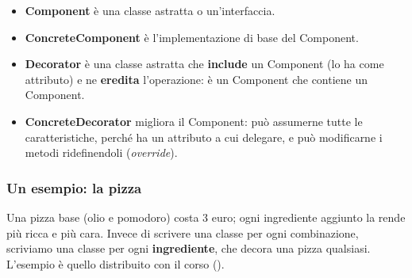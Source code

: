 
\noindent\begin{minipage}[c]{0.45\textwidth}
\centering
{}
\end{minipage}\hfill
\begin{minipage}[c]{0.52\textwidth}
\begin{itemize}
  \item \textbf{Component} è una classe astratta o un'interfaccia.
  \item \textbf{ConcreteComponent} è l'implementazione di base del Component.
  \item \textbf{Decorator} è una classe astratta che \textbf{include} un Component (lo ha come attributo) e ne
        \textbf{eredita} l'operazione: è un Component che contiene un Component.
  \item \textbf{ConcreteDecorator} migliora il Component: può assumerne tutte le caratteristiche, perché ha un attributo
         a cui delegare, e può modificarne i metodi ridefinendoli (\textit{override}).
\end{itemize}
\end{minipage}

\subsubsection*{Un esempio: la pizza}

Una pizza base (olio e pomodoro) costa 3 euro; ogni ingrediente aggiunto la rende più ricca e più cara. Invece di scrivere
una classe per ogni combinazione, scriviamo una classe per ogni \textbf{ingrediente}, che decora una pizza qualsiasi.
L'esempio è quello distribuito con il corso ().


